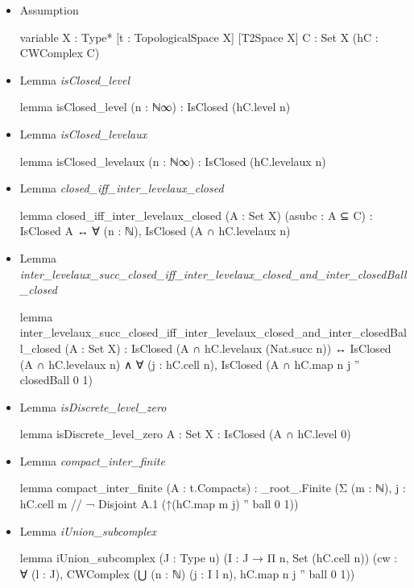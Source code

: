 \documentclass[colorinlistoftodos]{article}
\newcommand{\comment}[1]{\todo[color=lightgray, nolist]{#1}}
\begin{document}
\begin{itemize}
  \item Assumption
\begin{leancode}
variable {X : Type*} [t : TopologicalSpace X] [T2Space X] {C : Set X} (hC : CWComplex C)
\end{leancode}
  \item Lemma \emph{isClosed\_level}
\begin{leancode}
lemma isClosed_level (n : ℕ∞) : IsClosed (hC.level n)
\end{leancode}
  \item Lemma \emph{isClosed\_levelaux}
\begin{leancode}
lemma isClosed_levelaux (n : ℕ∞) : IsClosed (hC.levelaux n)
\end{leancode}
  \item Lemma \emph{closed\_iff\_inter\_levelaux\_closed}
\begin{leancode}
lemma closed_iff_inter_levelaux_closed (A : Set X) (asubc : A ⊆ C) :
IsClosed A ↔ ∀ (n : ℕ), IsClosed (A ∩ hC.levelaux n)
\end{leancode}
  \item Lemma \emph{inter\_levelaux\_succ\_closed\_iff\_inter\_levelaux\_closed\_and\_inter\_closedBall\_closed}
\begin{leancode}
lemma inter_levelaux_succ_closed_iff_inter_levelaux_closed_and_inter_closedBall_closed
(A : Set X) : IsClosed (A ∩ hC.levelaux (Nat.succ n)) ↔
IsClosed (A ∩ hC.levelaux n) ∧ ∀ (j : hC.cell n), IsClosed (A ∩ hC.map n j '' closedBall 0 1)
\end{leancode}
  \item Lemma \emph{isDiscrete\_level\_zero}
\begin{leancode}
lemma isDiscrete_level_zero {A : Set X} : IsClosed (A ∩ hC.level 0)
\end{leancode}
  \item Lemma \emph{compact\_inter\_finite}
\begin{leancode}
lemma compact_inter_finite (A : t.Compacts) :
  _root_.Finite (Σ (m : ℕ), {j : hC.cell m // ¬ Disjoint A.1 (↑(hC.map m j) '' ball 0 1)})
\end{leancode}
  \item Lemma \emph{iUnion\_subcomplex} \comment{Use CWComplex\_ subcomplex}
\begin{leancode}
lemma iUnion_subcomplex (J : Type u) (I : J → Π n, Set (hC.cell n))
(cw : ∀ (l : J), CWComplex (⋃ (n : ℕ) (j : I l n), hC.map n j '' ball 0 1))

\end{leancode}
\end{itemize}
\end{document}
